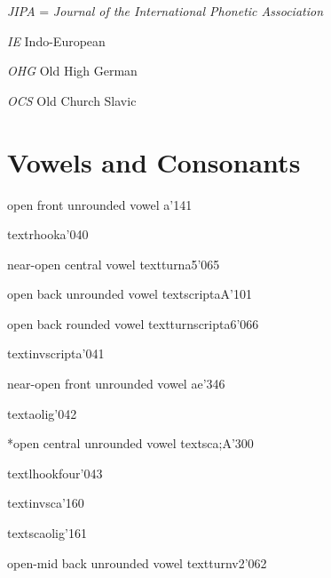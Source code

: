 \emph{JIPA} = \emph{Journal of the International Phonetic Association}

\emph{IE} Indo-European

\emph{OHG} Old High German

\emph{OCS} Old Church Slavic


\newpage
\section{Vowels and Consonants}\label{list:symbols}

\begingroup
\setlength\parindent{0pt}

\medskip

%
  {open front unrounded vowel}%
  {a}{}{\ipaall}{'141}

%
  {}%
  {\tbs textrhooka}{}{\PSG}{'040}

%
  {near-open central vowel}%
  {\tbs textturna}{5}{\ipaall}{'065}

%
  {open back unrounded vowel}%
  {\tbs textscripta}{A}{\ipaall}{'101}

%
  {open back rounded vowel}%
  {\tbs textturnscripta}{6}{\ipaall}{'066}

%
  {}%
  {\tbs textinvscripta}{}{\PSG}{'041}

%
  {near-open front unrounded vowel}%
  {\tbs ae}{}{\ipaall}{'346}

%
  {}%
  {\tbs textaolig}{}{\PSG}{'042}

%
  {*open central unrounded vowel}%
  {\tbs textsca}{\tbs;A}{\PSG}{'300}%

%
  {}%
  {\tbs textlhookfour}{}{\PSG}{'043}

%
  {}%
  {\tbs textinvsca}{}{\PSG}{'160}

%
  {}%
  {\tbs textscaolig}{}{\PSG}{'161}

%
  {open-mid back unrounded vowel}%
  {\tbs textturnv}{2}{\ipaall}{'062}%


